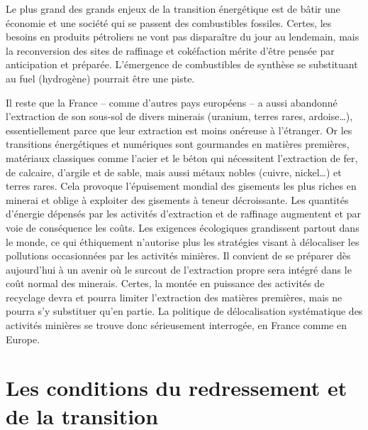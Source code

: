 \documentclass[a4paper]{article}
\begin{document}
Le plus grand des grands enjeux de la transition énergétique est de bâtir une économie et une société qui se passent des combustibles fossiles. Certes, les besoins en produits pétroliers ne vont pas disparaître du jour au lendemain, mais la reconversion des sites de raffinage et cokéfaction mérite d’être pensée par anticipation et préparée. L’émergence de combustibles de synthèse  se substituant au fuel (hydrogène) pourrait être une piste.

Il reste que la France – comme d’autres pays européens – a aussi abandonné l’extraction de son sous-sol de divers minerais (uranium, terres rares, ardoise…), essentiellement parce que leur extraction est moins onéreuse à l’étranger. Or les transitions énergétiques et numériques sont gourmandes en matières premières, matériaux classiques comme l’acier et le béton qui nécessitent l’extraction de fer, de calcaire, d’argile et de sable, mais aussi métaux nobles (cuivre, nickel…) et terres rares. Cela provoque l’épuisement mondial des gisements les plus riches en minerai et oblige à exploiter des gisements à teneur décroissante. Les quantités d’énergie dépensés par les activités d’extraction et  de raffinage augmentent et par voie de conséquence les coûts. Les exigences écologiques grandissent partout dans le monde, ce qui éthiquement n’autorise plus les stratégies visant à délocaliser les pollutions occasionnées par les activités minières. Il convient de se préparer dès aujourd’hui à un avenir où le surcout de l’extraction propre sera intégré dans le coût normal des minerais. Certes, la montée en puissance des activités de recyclage devra et pourra limiter l’extraction des matières premières, mais ne pourra s’y substituer qu’en partie. La politique de délocalisation systématique des activités minières se trouve donc sérieusement interrogée, en France comme en Europe.  

\section{Les conditions du redressement et de la transition}
\end{document}
